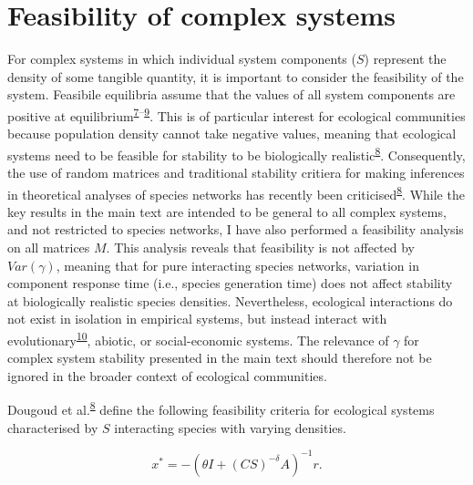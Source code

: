 \documentclass[]{article}
\begin{document}
\hypertarget{Feasibility}{\section{Feasibility of complex
systems}\label{Feasibility}}

For complex systems in which individual system components (\(S\))
represent the density of some tangible quantity, it is important to
consider the feasibility of the system. Feasibile equilibria assume that
the values of all system components are positive at
equilibrium\textsuperscript{\protect\hyperlink{ref-Grilli2017}{7}--\protect\hyperlink{ref-Song2018}{9}}.
This is of particular interest for ecological communities because
population density cannot take negative values, meaning that ecological
systems need to be feasible for stability to be biologically
realistic\textsuperscript{\protect\hyperlink{ref-Dougoud2018}{8}}.
Consequently, the use of random matrices and traditional stability
critiera for making inferences in theoretical analyses of species
networks has recently been
criticised\textsuperscript{\protect\hyperlink{ref-Dougoud2018}{8}}.
While the key results in the main text are intended to be general to all
complex systems, and not restricted to species networks, I have also
performed a feasibility analysis on all matrices \(M\). This analysis
reveals that feasibility is not affected by \(Var(\gamma)\), meaning
that for pure interacting species networks, variation in component
response time (i.e., species generation time) does not affect stability
at biologically realistic species densities. Nevertheless, ecological
interactions do not exist in isolation in empirical systems, but instead
interact with
evolutionary\textsuperscript{\protect\hyperlink{ref-Patel2018}{10}},
abiotic, or social-economic systems. The relevance of \(\gamma\) for
complex system stability presented in the main text should therefore not
be ignored in the broader context of ecological communities.

Dougoud et al.\textsuperscript{\protect\hyperlink{ref-Dougoud2018}{8}}
define the following feasibility criteria for ecological systems
characterised by \(S\) interacting species with varying densities.

\[x^{*} = -\left(\theta I + (CS)^{-\delta}A\right)^{-1}r.\]
\end{document}
